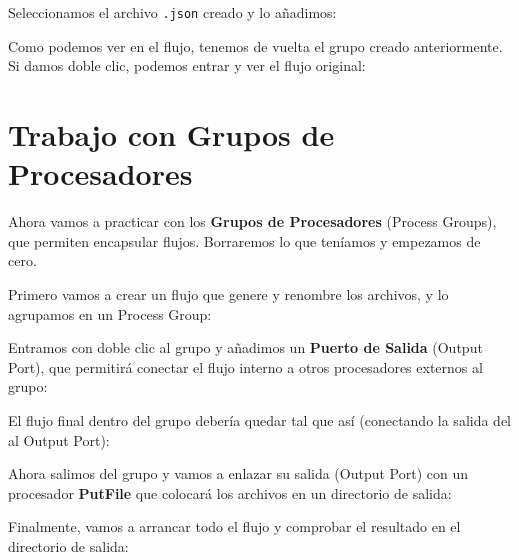 \documentclass{../../miPlantilla}
\begin{document}
\newpage

Seleccionamos el archivo \texttt{.json} creado y lo añadimos:


Como podemos ver en el flujo, tenemos de vuelta el grupo creado anteriormente. Si damos doble clic, podemos entrar y ver el flujo original:


\newpage

\section{Trabajo con Grupos de Procesadores}
Ahora vamos a practicar con los \textbf{Grupos de Procesadores} (Process Groups), que permiten encapsular flujos. Borraremos lo que teníamos y empezamos de cero.

Primero vamos a crear un flujo que genere y renombre los archivos, y lo agrupamos en un Process Group:


Entramos con doble clic al grupo y añadimos un \textbf{Puerto de Salida} (Output Port), que permitirá conectar el flujo interno a otros procesadores externos al grupo:

\begin{figure}[H]
    \centering
    \begin{minipage}{0.1\textwidth}
    \end{minipage}\hfill
    \begin{minipage}{0.8\textwidth}
    \end{minipage}
\end{figure}

\newpage

El flujo final dentro del grupo debería quedar tal que así (conectando la salida del  al Output Port):


Ahora salimos del grupo y vamos a enlazar su salida (Output Port) con un procesador \textbf{PutFile} que colocará los archivos en un directorio de salida:


\newpage

Finalmente, vamos a arrancar todo el flujo y comprobar el resultado en el directorio de salida:

\end{document}
